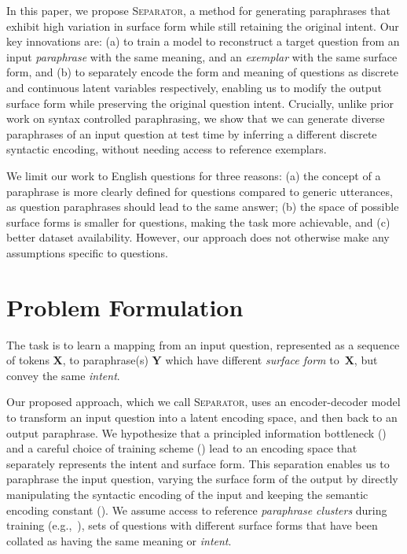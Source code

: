 \documentclass[11pt,a4paper]{article}
\begin{document}
In this paper, we propose \textsc{Separator}, a method for generating
paraphrases that exhibit high variation in surface form while still
retaining the original intent. Our key innovations are: (a) to train a model
to reconstruct a target question from an input \textit{paraphrase} with the same
meaning, and an \textit{exemplar} with the same surface form, and (b) to separately encode the form and meaning of
questions as discrete and continuous latent variables respectively, enabling us to modify the output surface form
while preserving the original question intent.   Crucially, unlike
prior work on syntax controlled paraphrasing, we show that we can
generate diverse paraphrases of an input question at test time by
inferring a different discrete syntactic encoding, without needing access to
reference exemplars. 


We limit our work to English questions for three reasons: (a) the concept of a
paraphrase is more clearly defined for questions compared to generic
utterances, as question paraphrases should lead to the same answer;
(b) the space of possible surface forms is smaller for questions,
making the task more achievable, and (c) better dataset
availability. However, our approach does not otherwise make any
assumptions specific to questions.












\section{Problem Formulation}









The task is to learn a mapping from an input question, represented as
a sequence of tokens $\textbf{X}$, to paraphrase(s) $\textbf{Y}$ which
have different \textit{surface form} to~$\textbf{X}$, but convey the
same \textit{intent}.

Our proposed approach, which we call \mbox{\textsc{Separator}}, uses an
encoder-decoder model to transform an input question into a latent
encoding space, and then back to an output paraphrase. We hypothesize
that a principled information bottleneck () and a
careful choice of training scheme () lead to an
encoding space that separately represents the intent and surface
form. This separation enables us to paraphrase the input question,
varying the surface form of the output by directly manipulating the
syntactic encoding of the input and keeping the semantic encoding
constant (). We assume access to reference
\textit{paraphrase clusters} during training (e.g.,~),
sets of questions with different surface forms that have been collated
as having the same meaning or \textit{intent}.
\end{document}
